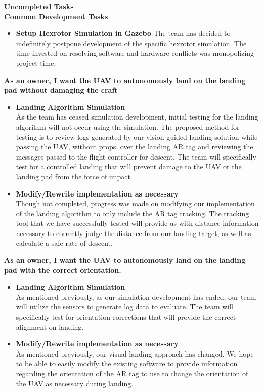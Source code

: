 \vspace{5mm}
\noindent\Large{\textbf{Uncompleted Tasks}}\\
\vspace{4mm}
\noindent \large{\textbf{Common Development Tasks}}
\normalsize
\begin{itemize}
\item \textbf{Setup Hexrotor Simulation in Gazebo}
The team has decided to indefinitely postpone development of the specific hexrotor simulation. The time invested on resolving software and hardware conflicts was monopolizing project time.
\end{itemize} 

\vspace{3mm}
\noindent \large{\textbf{As an owner, I want the UAV to autonomously land on the landing pad without damaging the craft}}
\normalsize
\begin{itemize}
\item \textbf{Landing Algorithm Simulation}\\
As the team has ceased simulation development, initial testing for the landing algorithm will not occur using the simulation. The proposed method for testing is to review logs generated by our vision guided landing solution while passing the UAV, without props, over the landing AR tag and reviewing the messages passed to the flight controller for descent. The team will specifically test for a controlled landing that will prevent damage to the UAV or the landing pad from the force of impact.
\item \textbf{Modify/Rewrite implementation as necessary}\\
Though not completed, progress was made on modifying our implementation of the landing algorithm to only include the AR tag tracking. The tracking tool that we have successfully tested will provide us with distance information necessary to correctly judge the distance from our landing target, as well as calculate a safe rate of descent.
\end{itemize}



\vspace{3mm}
\noindent \large{\textbf{As an owner, I want the UAV to autonomously land on the landing pad with the correct orientation.}}
\normalsize
\begin{itemize}
\item \textbf{Landing Algorithm Simulation}\\
As mentioned previously, as our simulation development has ended, our team will utilize the sensors to generate log data to evaluate. The team will specifically test for orientation corrections that will provide the correct alignment on landing.
\item \textbf{Modify/Rewrite implementation as necessary}\\
As mentioned previously, our visual landing approach has changed. We hope to be able to easily modify the existing software to provide information regarding the orientation of the AR tag to use to change the orientation of the UAV as necessary during landing.
\end{itemize}

